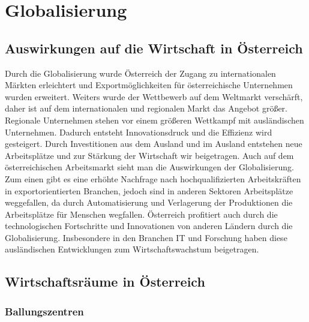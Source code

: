 \section{Globalisierung}

\subsection{Auswirkungen auf die Wirtschaft in Österreich}

Durch die Globalisierung wurde Österreich der Zugang zu internationalen Märkten erleichtert und Exportmöglichkeiten für österreichische Unternehmen wurden erweitert. Weiters wurde der Wettbewerb auf dem Weltmarkt verschärft, daher ist auf dem internationalen und regionalen Markt das Angebot größer. Regionale Unternehmen stehen vor einem größeren Wettkampf mit ausländischen Unternehmen. Dadurch entsteht Innovationsdruck und die Effizienz wird gesteigert.
Durch Investitionen aus dem Ausland und im Ausland entstehen neue Arbeitsplätze und zur Stärkung der Wirtschaft wir beigetragen. Auch auf dem österreichischen Arbeitsmarkt sieht man die Auswirkungen der Globalisierung. Zum einen gibt es eine erhöhte Nachfrage nach hochqualifizierten Arbeitskräften in exportorientierten Branchen, jedoch sind in anderen Sektoren Arbeitsplätze weggefallen, da durch Automatisierung und Verlagerung der Produktionen die Arbeitsplätze für Menschen wegfallen.
Österreich profitiert auch durch die technologischen Fortschritte und Innovationen von anderen Ländern durch die Globalisierung. Insbesondere in den Branchen IT und Forschung haben diese ausländischen Entwicklungen zum Wirtschaftswachstum beigetragen.

\subsection{Wirtschaftsräume in Österreich}

\subsubsection{Ballungszentren}

